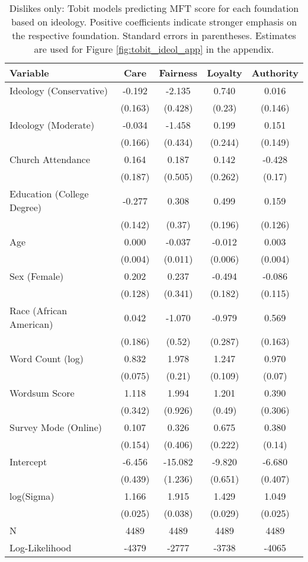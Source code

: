 \begin{table}[ht]
\centering
\caption{Dislikes only: Tobit models predicting MFT score for each foundation based 
           on ideology. Positive coefficients indicate stronger emphasis on the respective 
           foundation. Standard errors in parentheses. Estimates are used for 
           Figure \ref{fig:tobit_ideol_app} in the appendix.} 
\label{tab:tobit_dislike}
\begingroup\footnotesize
\begin{tabular}{lcccc}
  \hline
Variable & Care & Fairness & Loyalty & Authority \\ 
  \hline
Ideology (Conservative) & -0.192 &  -2.135 &  0.740 &  0.016 \\ 
   & (0.163) & (0.428) & (0.23) & (0.146) \\ 
  Ideology (Moderate) & -0.034 &  -1.458 &  0.199 &  0.151 \\ 
   & (0.166) & (0.434) & (0.244) & (0.149) \\ 
  Church Attendance &  0.164 &   0.187 &  0.142 & -0.428 \\ 
   & (0.187) & (0.505) & (0.262) & (0.17) \\ 
  Education (College Degree) & -0.277 &   0.308 &  0.499 &  0.159 \\ 
   & (0.142) & (0.37) & (0.196) & (0.126) \\ 
  Age &  0.000 &  -0.037 & -0.012 &  0.003 \\ 
   & (0.004) & (0.011) & (0.006) & (0.004) \\ 
  Sex (Female) &  0.202 &   0.237 & -0.494 & -0.086 \\ 
   & (0.128) & (0.341) & (0.182) & (0.115) \\ 
  Race (African American) &  0.042 &  -1.070 & -0.979 &  0.569 \\ 
   & (0.186) & (0.52) & (0.287) & (0.163) \\ 
  Word Count (log) &  0.832 &   1.978 &  1.247 &  0.970 \\ 
   & (0.075) & (0.21) & (0.109) & (0.07) \\ 
  Wordsum Score &  1.118 &   1.994 &  1.201 &  0.390 \\ 
   & (0.342) & (0.926) & (0.49) & (0.306) \\ 
  Survey Mode (Online) &  0.107 &   0.326 &  0.675 &  0.380 \\ 
   & (0.154) & (0.406) & (0.222) & (0.14) \\ 
  Intercept & -6.456 & -15.082 & -9.820 & -6.680 \\ 
   & (0.439) & (1.236) & (0.651) & (0.407) \\ 
  log(Sigma) &  1.166 &   1.915 &  1.429 &  1.049 \\ 
   & (0.025) & (0.038) & (0.029) & (0.025) \\ 
   \hline
N & 4489 & 4489 & 4489 & 4489 \\ 
  Log-Likelihood & -4379 & -2777 & -3738 & -4065 \\ 
   \hline
\end{tabular}
\endgroup
\end{table}

